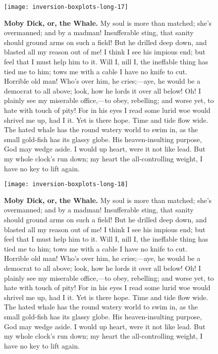 \documentclass{article}
\begin{document}
\begin{figure}[!htp]
  \begin{center}
      \texttt{[image: inversion-boxplots-long-17]}
    \caption{
        \textbf{Moby Dick, or, the Whale.}
My soul is more than matched; she's overmanned; and by a madman! Insufferable sting, that sanity should ground arms on such a field! But he drilled deep down, and blasted all my reason out of me! I think I see his impious end; but feel that I must help him to it. Will I, nill I, the ineffable thing has tied me to him; tows me with a cable I have no knife to cut. Horrible old man! Who's over him, he cries;—aye, he would be a democrat to all above; look, how he lords it over all below! Oh! I plainly see my miserable office,—to obey, rebelling; and worse yet, to hate with touch of pity! For in his eyes I read some lurid woe would shrivel me up, had I it. Yet is there hope. Time and tide flow wide. The hated whale has the round watery world to swim in, as the small gold-fish has its glassy globe. His heaven-insulting purpose, God may wedge aside. I would up heart, were it not like lead. But my whole clock's run down; my heart the all-controlling weight, I have no key to lift again. 
    }
  \end{center}
\end{figure}

\begin{figure}[!htp]
  \begin{center}
      \texttt{[image: inversion-boxplots-long-18]}
    \caption{
        \textbf{Moby Dick, or, the Whale.}
My soul is more than matched; she's overmanned; and by a madman! Insufferable sting, that sanity should ground arms on such a field! But he drilled deep down, and blasted all my reason out of me! I think I see his impious end; but feel that I must help him to it. Will I, nill I, the ineffable thing has tied me to him; tows me with a cable I have no knife to cut. Horrible old man! Who's over him, he cries;—aye, he would be a democrat to all above; look, how he lords it over all below! Oh! I plainly see my miserable office,—to obey, rebelling; and worse yet, to hate with touch of pity! For in his eyes I read some lurid woe would shrivel me up, had I it. Yet is there hope. Time and tide flow wide. The hated whale has the round watery world to swim in, as the small gold-fish has its glassy globe. His heaven-insulting purpose, God may wedge aside. I would up heart, were it not like lead. But my whole clock's run down; my heart the all-controlling weight, I have no key to lift again. 
    }
  \end{center}
\end{figure}
\end{document}
